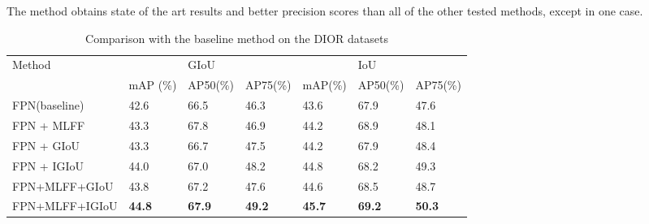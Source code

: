 The method obtains state of the art results and better precision scores than all of the other tested methods, except in one case. 

\begin{table}[h!]
	\centering
	\begin{tabular}{@{}lllllll@{}}
		\toprule
		Method       &               & GIoU          &               &               & IoU           &              \\ \cmidrule(l){2-7} 
			    & mAP (\%)      & AP50(\%)      & AP75(\%)      & mAP(\%)       & AP50(\%)      & AP75(\%)      \\ \midrule
	      FPN(baseline) & 42.6          & 66.5          & 46.3          & 43.6          & 67.9          & 47.6          \\
	      FPN + MLFF    & 43.3          & 67.8          & 46.9          & 44.2          & 68.9          & 48.1          \\
	      FPN + GIoU    & 43.3          & 66.7          & 47.5          & 44.2          & 67.9          & 48.4          \\
	      FPN + IGIoU   & 44.0          & 67.0          & 48.2          & 44.8          & 68.2          & 49.3          \\
	      FPN+MLFF+GIoU & 43.8          & 67.2          & 47.6          & 44.6          & 68.5          & 48.7          \\
		FPN+MLFF+IGIoU& \textbf{44.8} & \textbf{67.9} & \textbf{49.2} & \textbf{45.7} & \textbf{69.2}& \textbf{50.3}\\ \bottomrule
	\end{tabular}
	\caption{Comparison with the baseline method on the DIOR datasets}
	\label{tab:ODRSIres}
\end{table}
\clearpage
